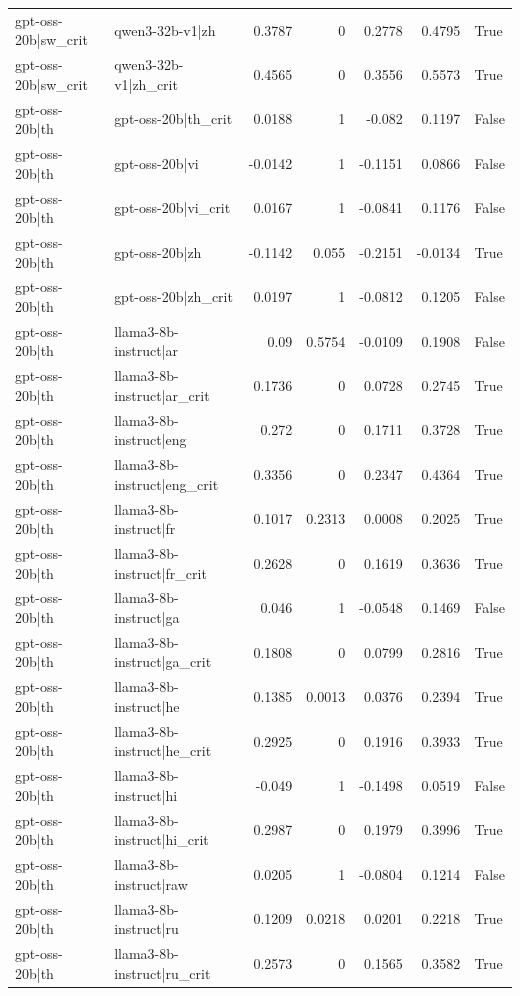\begin{table}
\begin{tabular}{l l r r r r l}
gpt-oss-20b|sw_crit & qwen3-32b-v1|zh & 0.3787 & 0 & 0.2778 & 0.4795 & True \\
gpt-oss-20b|sw_crit & qwen3-32b-v1|zh_crit & 0.4565 & 0 & 0.3556 & 0.5573 & True \\
gpt-oss-20b|th & gpt-oss-20b|th_crit & 0.0188 & 1 & -0.082 & 0.1197 & False \\
gpt-oss-20b|th & gpt-oss-20b|vi & -0.0142 & 1 & -0.1151 & 0.0866 & False \\
gpt-oss-20b|th & gpt-oss-20b|vi_crit & 0.0167 & 1 & -0.0841 & 0.1176 & False \\
gpt-oss-20b|th & gpt-oss-20b|zh & -0.1142 & 0.055 & -0.2151 & -0.0134 & True \\
gpt-oss-20b|th & gpt-oss-20b|zh_crit & 0.0197 & 1 & -0.0812 & 0.1205 & False \\
gpt-oss-20b|th & llama3-8b-instruct|ar & 0.09 & 0.5754 & -0.0109 & 0.1908 & False \\
gpt-oss-20b|th & llama3-8b-instruct|ar_crit & 0.1736 & 0 & 0.0728 & 0.2745 & True \\
gpt-oss-20b|th & llama3-8b-instruct|eng & 0.272 & 0 & 0.1711 & 0.3728 & True \\
gpt-oss-20b|th & llama3-8b-instruct|eng_crit & 0.3356 & 0 & 0.2347 & 0.4364 & True \\
gpt-oss-20b|th & llama3-8b-instruct|fr & 0.1017 & 0.2313 & 0.0008 & 0.2025 & True \\
gpt-oss-20b|th & llama3-8b-instruct|fr_crit & 0.2628 & 0 & 0.1619 & 0.3636 & True \\
gpt-oss-20b|th & llama3-8b-instruct|ga & 0.046 & 1 & -0.0548 & 0.1469 & False \\
gpt-oss-20b|th & llama3-8b-instruct|ga_crit & 0.1808 & 0 & 0.0799 & 0.2816 & True \\
gpt-oss-20b|th & llama3-8b-instruct|he & 0.1385 & 0.0013 & 0.0376 & 0.2394 & True \\
gpt-oss-20b|th & llama3-8b-instruct|he_crit & 0.2925 & 0 & 0.1916 & 0.3933 & True \\
gpt-oss-20b|th & llama3-8b-instruct|hi & -0.049 & 1 & -0.1498 & 0.0519 & False \\
gpt-oss-20b|th & llama3-8b-instruct|hi_crit & 0.2987 & 0 & 0.1979 & 0.3996 & True \\
gpt-oss-20b|th & llama3-8b-instruct|raw & 0.0205 & 1 & -0.0804 & 0.1214 & False \\
gpt-oss-20b|th & llama3-8b-instruct|ru & 0.1209 & 0.0218 & 0.0201 & 0.2218 & True \\
gpt-oss-20b|th & llama3-8b-instruct|ru_crit & 0.2573 & 0 & 0.1565 & 0.3582 & True \\

\end{tabular}
\end{table}
